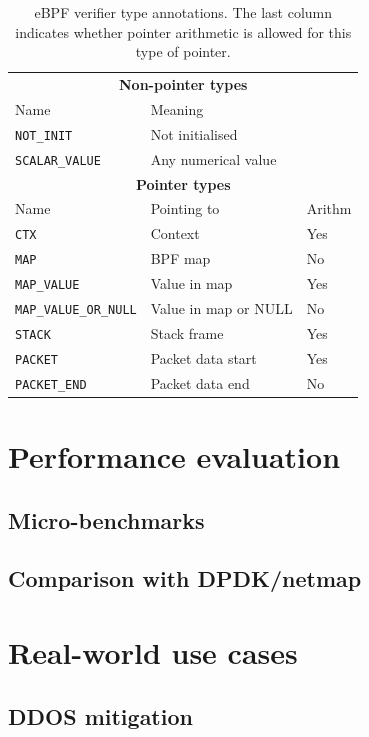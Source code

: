 \documentclass[10pt]{sig-alternate-05-2015}
\begin{document}
\begin{table}[htbp]
\caption{\label{tbl:reg-types}
eBPF verifier type annotations. The last column indicates whether pointer arithmetic is allowed for this type of pointer.}
\centering
\begin{tabular}{lll}
\toprule
\multicolumn{3}{c}{\textbf{Non-pointer types}} \\
Name & Meaning \\
\midrule
\texttt{NOT\_INIT}            & Not initialised         \\
\texttt{SCALAR\_VALUE}        & Any numerical value       \\
\midrule
\multicolumn{3}{c}{\textbf{Pointer types}} \\
Name & Pointing to & Arithm\\
\midrule
\texttt{CTX}                  & Context              & Yes \\
\texttt{MAP}                  & BPF map              & No  \\
\texttt{MAP\_VALUE}           & Value in map         & Yes \\
\texttt{MAP\_VALUE\_OR\_NULL} & Value in map or NULL & No  \\
\texttt{STACK}                & Stack frame          & Yes \\
\texttt{PACKET}               & Packet data start    & Yes \\
\texttt{PACKET\_END}          & Packet data end      & No  \\
\bottomrule
\end{tabular}
\end{table}
\section{Performance evaluation}
\label{sec:perf-eval}
\subsection{Micro-benchmarks}
\label{sec:org72788e2}
\subsection{Comparison with DPDK/netmap}
\label{sec:org7f03063}
\section{Real-world use cases}
\label{sec:org60dd487}
\subsection{DDOS mitigation}
\label{sec:org5f83e1d}
\end{document}
